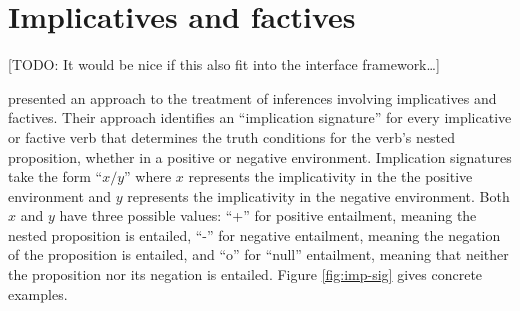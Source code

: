 \section*{Implicatives and factives}

[TODO: It would be nice if this also fit into the interface framework\ldots]

\citet{nairn:icos2006} presented an approach to the treatment of inferences
involving implicatives and factives.  Their approach identifies an ``implication
signature'' for every implicative or factive verb that determines the truth
conditions for the verb's nested proposition, whether in a positive or negative
environment.  Implication signatures take the form ``$x/y$'' where $x$
represents the implicativity in the the positive environment and $y$ represents
the implicativity in the negative environment.  Both $x$ and $y$ have three
possible values: ``+'' for positive entailment, meaning the nested proposition
is entailed, ``-'' for negative entailment, meaning the negation of the proposition
is entailed, and ``o'' for ``null'' entailment, meaning that neither the
proposition nor its negation is entailed. Figure \ref{fig:imp-sig} gives
concrete examples.%


